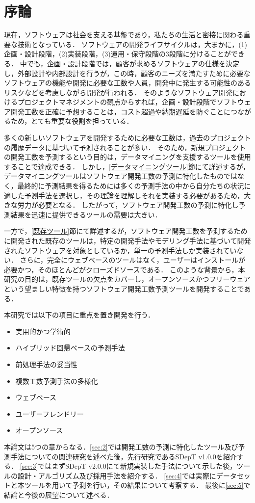 \section{序論}\label{sec:1}

現在，ソフトウェアは社会を支える基盤であり，私たちの生活と密接に関わる重要な技術となっている．
ソフトウェアの開発ライフサイクルは，大まかに，(1)企画・設計段階，(2)実装段階，(3)運用・保守段階の3段階に分けることができる．
中でも，企画・設計段階では，顧客が求めるソフトウェアの仕様を決定し，外部設計や内部設計を行うが，この時，顧客のニーズを満たすために必要なソフトウェアの機能や開発に必要な工数や人員，開発中に発生する可能性のあるリスクなどを考慮しながら開発が行われる．
そのようなソフトウェア開発におけるプロジェクトマネジメントの観点からすれば，企画・設計段階でソフトウェア開発工数を正確に予想することは，コスト超過や納期遅延を防ぐことにつながるため，とても重要な役割を担っている．

多くの新しいソフトウェアを開発するために必要な工数は，過去のプロジェクトの履歴データに基づいて予測されることが多い．
そのため，新規プロジェクトの開発工数を予測するという目的は，データマイニングを支援するツールを使用することで達成できる．
しかし，\ref{データマイニングツール}節にて詳述するが，データマイニングツールはソフトウェア開発工数の予測に特化したものではなく，最終的に予測結果を得るためには多くの予測手法の中から自分たちの状況に適した予測手法を選択し，その理論を理解しそれを実装する必要があるため，大きな労力が必要となる．
したがって，ソフトウェア開発工数の予測に特化し予測結果を迅速に提供できるツールの需要は大きい．

一方で，\ref{既存ツール}節にて詳述するが，ソフトウェア開発工数を予測するために開発された既存のツールは，特定の開発手法やモデリング手法に基づいて開発されたソフトウェアを対象としているか，単一の予測手法しか実装されていない．
さらに，完全にウェブベースのツールはなく，ユーザーはインストールが必要かつ，そのほとんどがクローズドソースである．
このような背景から，本研究の目的は，既存ツールの欠点をカバーし，オープンソースかつフリーウェアという望ましい特徴を持つソフトウェア開発工数予測ツールを開発することである．

本研究では以下の項目に重点を置き開発を行う．
\begin{itemize}
  \item 実用的かつ学術的
  \item ハイブリッド回帰ベースの予測手法
  \item 前処理手法の妥当性
  \item 複数工数予測手法の多様化
  \item ウェブベース
  \item ユーザーフレンドリー
  \item オープンソース
\end{itemize}

本論文は5つの章からなる．\ref{sec:2}では開発工数の予測に特化したツール及び予測手法についての関連研究を述べた後，先行研究であるSDepT v1.0.0を紹介する．
\ref{sec:3}ではまずSDepT v2.0.0にて新規実装した手法について示した後，ツールの設計・アルゴリズム及び採用手法を紹介する．
\ref{sec:4}では実際にデータセットと本ツールを用いて予測を行い，その結果について考察する．
最後に\ref{sec:5}で結論と今後の展望について述べる．
